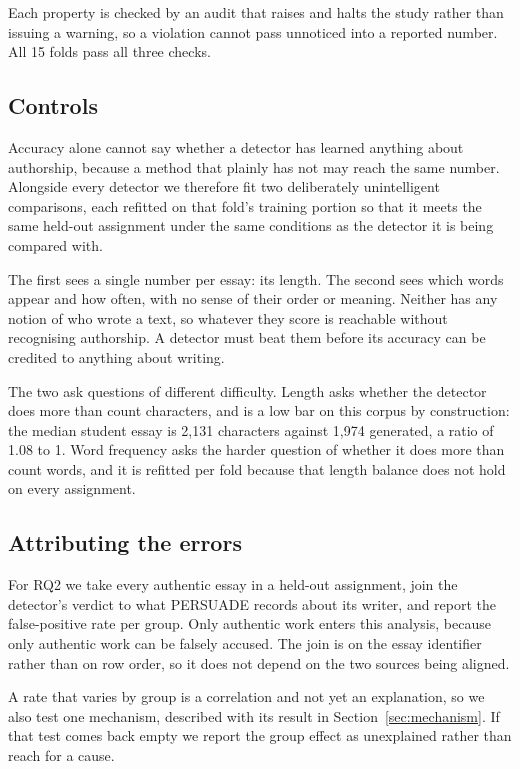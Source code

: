 \documentclass[11pt,a4paper]{article}
\begin{document}
Each property is checked by an audit that raises and halts the study rather
than issuing a warning, so a violation cannot pass unnoticed into a
reported number. All 15 folds pass all three checks.

\subsection{Controls}

Accuracy alone cannot say whether a detector has learned anything about
authorship, because a method that plainly has not may reach the same
number. Alongside every detector we therefore fit two deliberately
unintelligent comparisons, each refitted on that fold's training portion so
that it meets the same held-out assignment under the same conditions as the
detector it is being compared with.

The first sees a single number per essay: its length. The second sees which
words appear and how often, with no sense of their order or meaning.
Neither has any notion of who wrote a text, so whatever they score is
reachable without recognising authorship. A detector must beat them before
its accuracy can be credited to anything about writing.

The two ask questions of different difficulty. Length asks whether the
detector does more than count characters, and is a low bar on this corpus
by construction: the median student essay is 2{,}131 characters against
1{,}974 generated, a ratio of 1.08 to 1. Word frequency asks the harder
question of whether it does more than count words, and it is refitted per
fold because that length balance does not hold on every assignment.

\subsection{Attributing the errors}

For RQ2 we take every authentic essay in a held-out assignment, join the
detector's verdict to what PERSUADE records about its writer, and report
the false-positive rate per group. Only authentic work enters this
analysis, because only authentic work can be falsely accused. The join is
on the essay identifier rather than on row order, so it does not depend on
the two sources being aligned.

A rate that varies by group is a correlation and not yet an explanation, so
we also test one mechanism, described with its result in
Section~\ref{sec:mechanism}. If that test comes back empty we report the group effect as
unexplained rather than reach for a cause.
\end{document}
